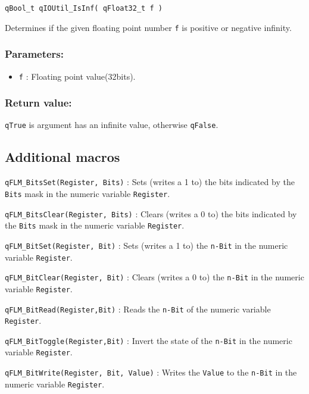 \noindent\hrulefill

\begin{lstlisting}[style=CStyle]
qBool_t qIOUtil_IsInf( qFloat32_t f )
\end{lstlisting}

Determines if the given floating point number \lstinline{f} is positive or negative infinity. 

\subsubsection*{Parameters:}
\begin{itemize}
    \item \lstinline{f} : Floating point value(32bits).
\end{itemize}

\subsubsection*{Return value:}
\lstinline{qTrue} is argument has an infinite value, otherwise \lstinline{qFalse}.

\subsection{Additional macros}

\lstinline{qFLM_BitsSet(Register, Bits)} : Sets (writes a 1 to) the bits indicated by the \lstinline{Bits} mask in the numeric variable \lstinline{Register}.

\lstinline{qFLM_BitsClear(Register, Bits)} : Clears (writes a 0 to) the bits indicated by the \lstinline{Bits} mask in the numeric variable \lstinline{Register}.

\lstinline{qFLM_BitSet(Register, Bit)} : Sets (writes a 1 to) the \lstinline{n-Bit} in the numeric variable \lstinline{Register}.

\lstinline{qFLM_BitClear(Register, Bit)} : Clears (writes a 0 to) the \lstinline{n-Bit} in the numeric variable \lstinline{Register}.

\lstinline{qFLM_BitRead(Register,Bit)} : Reads the \lstinline{n-Bit} of the numeric variable \lstinline{Register}.

\lstinline{qFLM_BitToggle(Register,Bit)} : Invert the state of the \lstinline{n-Bit} in the numeric variable \lstinline{Register}.

\lstinline{qFLM_BitWrite(Register, Bit, Value)} : Writes the \lstinline{Value} to the \lstinline{n-Bit} in the numeric variable \lstinline{Register}.

